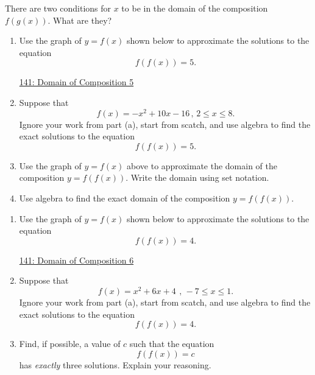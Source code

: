 \documentclass{ximera}
\begin{document}
\begin{question}   \label{Q1:Comp}
There are two conditions for $x$ to be in the domain of the composition $f(g(x))$. What are they?
\end{question}


\begin{example}  \label{Eerg4t4r5}
\begin{enumerate}

\item Use the graph of $y=f(x)$ shown below to approximate the solutions to the equation
\[
    f(f(x)) = 5 .
\]

\begin{onlineOnly}
    \begin{center}
\end{center}
\end{onlineOnly}

\href{https://www.desmos.com/calculator/d6zcmotesc}{141: Domain of Composition 5}

\item Suppose that 
\[
       f(x) = -x^2 +10x - 16 \, , \, 2\leq x \leq 8 .
\]
Ignore your work from part (a), start from scatch, and use algebra to find the exact solutions to the equation 
\[
    f(f(x)) = 5.
\]

\item Use the graph of $y=f(x)$ above to approximate the domain of the composition $y=f(f(x))$. Write the domain using set notation.

\item Use algebra to find the exact domain of the composition $y=f(f(x))$.

\end{enumerate}
\end{example}


\begin{question} \label{Q32443ggr}
\begin{enumerate}
\item Use the graph of $y=f(x)$ shown below to approximate the solutions to the equation
\[
    f(f(x)) = 4 .
\]

\begin{onlineOnly}
    \begin{center}
\end{center}
\end{onlineOnly}

\href{https://www.desmos.com/calculator/hbegdhlhbb}{141: Domain of Composition 6}

\item Suppose that 
\[
       f(x) = x^{2}+6x+4\  \, , \, -7\leq x\leq 1  .
\]
Ignore your work from part (a), start from scatch, and use algebra to find the exact solutions to the equation 
\[
    f(f(x)) = 4.
\]

\item Find, if possible, a value of $c$ such that the equation
\[
    f(f(x))=c
\]
has \emph{exactly} three solutions. Explain your reasoning.

\end{enumerate}

\end{question}
\end{document}
